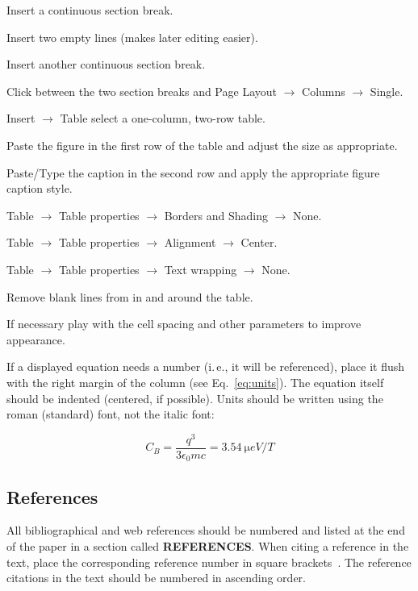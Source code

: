 \documentclass[acus,%
              ]{jacow}
\newcommand\SEC[1]{\textbf{\uppercase{#1}}}
\begin{document}
\begin{Enumerate}
\item	Insert a continuous section break.
\item	Insert two empty lines (makes later editing easier).
\item	Insert another continuous section break.
\item	Click between the two section breaks and Page Layout $\rightarrow$
        Columns $\rightarrow$ Single.
\item	Insert $\rightarrow$ Table select a one-column, two-row table.
\item	Paste the figure in the first row of the table and adjust the size as appropriate.
\item	Paste/Type the caption in the second row and apply the appropriate figure caption style.
\item	Table $\rightarrow$ Table properties $\rightarrow$ Borders and
        Shading $\rightarrow$ None.
\item	Table $\rightarrow$ Table properties $\rightarrow$ Alignment $\rightarrow$ Center.
\item	Table $\rightarrow$ Table properties $\rightarrow$ Text wrapping $\rightarrow$ None.
\item	Remove blank lines from in and around the table.
\item	If necessary play with the cell spacing and other parameters to improve appearance.
\end{Enumerate}

If a displayed equation needs a number (i.\,e., it will be referenced), place it flush with the right margin of the column (see Eq.~\ref{eq:units}). The equation itself should be indented (centered, if possible). Units should be written using the roman (standard) font,
not the italic font:

\begin{equation}\label{eq:units}
    C_B=\frac{q^3}{3\epsilon_{0} mc}=\SI{3.54}{\micro eV/T}
\end{equation}

\subsection{References}

All bibliographical and web references should be numbered and listed at the
end of the paper in a section called \SEC{References}. When citing a
reference in the text, place the corresponding reference number in square
brackets~\cite{exampl-ref}. The reference citations in the text should be numbered
in ascending order.
\end{document}
